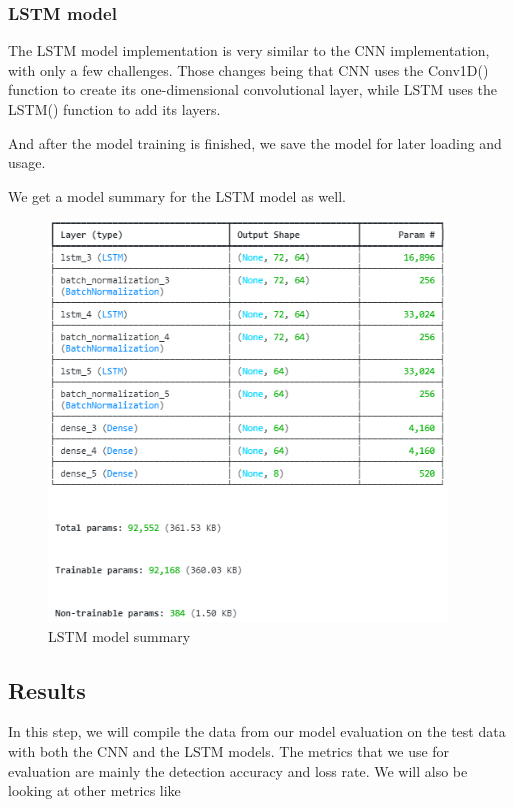\subsubsection{LSTM model}
The LSTM model implementation is very similar to the CNN implementation, with only a few challenges. Those changes being that CNN uses the Conv1D() function to create its one-dimensional convolutional layer, while LSTM uses the LSTM() function to add its layers.


And after the model training is finished, we save the model for later loading and usage.

\newpage

We get a model summary for the LSTM model as well.

\begin{figure}[h]
	\centering
	\includegraphics[width=400px]{figures/LSTM_model_summary.png}
	\caption{LSTM model summary}
	\label{fig:test}
\end{figure}













\subsection{Results}
In this step, we will compile the data from our model evaluation on the test data with both the CNN and the LSTM models. The metrics that we use for evaluation are mainly the detection accuracy and loss rate. We will also be looking at other metrics like

